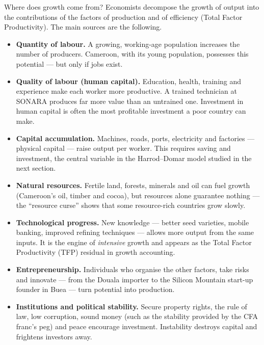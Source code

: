 \documentclass[11pt]{article}
\newcommand{\cle}[1]{{\popxbold\color{popdark}#1}}
\newcounter{popsec}
\newcounter{popsub}
\newcommand{\courssub}[1]{%
  \stepcounter{popsub}%
  \par\vspace{9pt}\noindent{\popxbold\fontsize{11.5}{13}\selectfont\color{popink}{\color{poporange}\thepopsec.\thepopsub}\hspace{6pt}#1}\par\nopagebreak\vspace{4pt}
}
\begin{document}
\courssub{The Sources of Economic Growth}

Where does growth come from? Economists decompose the growth of output into the contributions of the factors of production and of efficiency (Total Factor Productivity). The main sources are the following.

\begin{itemize}
\item \textbf{Quantity of labour.} A growing, working-age population increases the number of producers. Cameroon, with its young population, possesses this potential --- but only if jobs exist.
\item \textbf{Quality of labour (human capital).} Education, health, training and experience make each worker more productive. A trained technician at SONARA produces far more value than an untrained one. Investment in \cle{human capital} is often the most profitable investment a poor country can make.
\item \textbf{Capital accumulation.} Machines, roads, ports, electricity and factories --- \cle{physical capital} --- raise output per worker. This requires saving and investment, the central variable in the Harrod--Domar model studied in the next section.
\item \textbf{Natural resources.} Fertile land, forests, minerals and oil can fuel growth (Cameroon's oil, timber and cocoa), but resources alone guarantee nothing --- the ``resource curse'' shows that some resource-rich countries grow slowly.
\item \textbf{Technological progress.} New knowledge --- better seed varieties, mobile banking, improved refining techniques --- allows more output from the same inputs. It is the engine of \emph{intensive} growth and appears as the \cle{Total Factor Productivity (TFP)} residual in growth accounting.
\item \textbf{Entrepreneurship.} Individuals who organise the other factors, take risks and innovate --- from the Douala importer to the Silicon Mountain start-up founder in Buea --- turn potential into production.
\item \textbf{Institutions and political stability.} Secure property rights, the rule of law, low corruption, sound money (such as the stability provided by the CFA franc's peg) and peace encourage investment. Instability destroys capital and frightens investors away.
\end{itemize}
\end{document}
